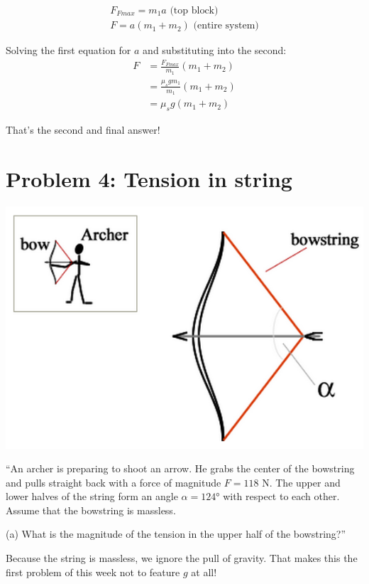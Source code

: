 \documentclass[12pt,a4paper]{report}
\begin{document}
\begin{align}
F_{Fmax} = m_1 a \text{ (top block)}\\
F = a(m_1 + m_2) \text{ (entire system)}
\end{align}

Solving the first equation for $a$ and substituting into the second:
\begin{align}
F &= \frac{F_{Fmax}}{m_1}(m_1 + m_2)\\
  &= \frac{\mu_s g m_1}{m_1}(m_1 + m_2)\\
  &= \mu_s g(m_1 + m_2)
\end{align}

That's the second and final answer!

\section{Problem 4: Tension in string}

\begin{center}
\includegraphics[scale=0.5]{Graphics/h3p4}
\end{center}

``An archer is preparing to shoot an arrow. He grabs the center of the bowstring and pulls straight back with a force of magnitude $F = 118$ N. The upper and lower halves of the string form an angle $\alpha = \ang{124}$ with respect to each other. Assume that the bowstring is massless.

(a) What is the magnitude of the tension in the upper half of the bowstring?''

Because the string is massless, we ignore the pull of gravity. That makes this the first problem of this week not to feature $g$ at all!	
\end{document}
